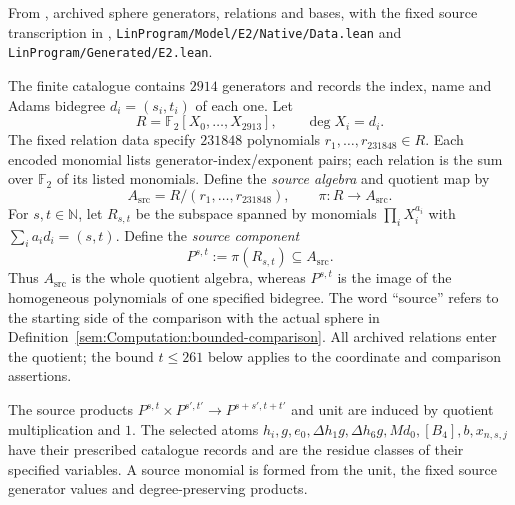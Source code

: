 \begin{definition}
\label{sem:Computation:fixed-archive}
From \cite{LinProgram}, archived sphere generators, relations and bases,
with the fixed source transcription in \cite{KIPSourcebbac1fc05843},
\texttt{LinProgram/Model/E2/Native/Data.lean} and
\texttt{LinProgram/Generated/E2.lean}.\par
The finite catalogue contains $2914$ generators and records the index,
name and Adams bidegree $d_i=(s_i,t_i)$ of each one. Let
\[
R=\mathbb F_2[X_0,\ldots,X_{2913}],\qquad \deg X_i=d_i.
\]
The fixed relation data specify $231848$ polynomials
$r_1,\ldots,r_{231848}\in R$. Each encoded monomial lists
generator-index/exponent pairs; each relation is the sum over $\mathbb F_2$
of its listed monomials. Define the \emph{source algebra} and quotient map by
\[
A_{\mathrm{src}}=R/(r_1,\ldots,r_{231848}),\qquad
\pi:R\longrightarrow A_{\mathrm{src}}.
\]
For $s,t\in\mathbb N$, let $R_{s,t}$ be the subspace spanned by monomials
$\prod_iX_i^{a_i}$ with $\sum_i a_i d_i=(s,t)$. Define the
\emph{source component}
\[
P^{s,t}:=\pi(R_{s,t})\subseteq A_{\mathrm{src}}.
\]
Thus $A_{\mathrm{src}}$ is the whole quotient algebra, whereas $P^{s,t}$
is the image of the homogeneous polynomials of one specified bidegree.
The word ``source'' refers to the starting side of the comparison with
the actual sphere in Definition~\ref{sem:Computation:bounded-comparison}.
All archived relations enter the quotient; the bound $t\leq261$ below
applies to the coordinate and comparison assertions.

The source products $P^{s,t}\times P^{s',t'}\to P^{s+s',t+t'}$ and unit
are induced by quotient multiplication and $1$. The selected atoms
$h_i,g,e_0,\Delta h_1g,\Delta h_6g,Md_0,[B_4],b,x_{n,s,j}$ have their
prescribed catalogue records and are the residue classes of their
specified variables. A source monomial is formed from the unit,
the fixed source generator values and degree-preserving products.


\end{definition}
